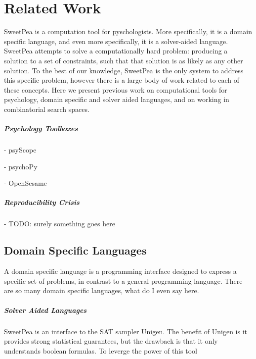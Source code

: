 

\chapter{Related Work}

SweetPea is a computation tool for pyschologists. More specifically, it is a domain specific language, and even more specifically, it is a solver-aided language. SweetPea attempts to solve a computationally hard problem: producing a solution to a set of constraints, such that that solution is as likely as any other solution. To the best of our knowledge, SweetPea is the only system to address this specific problem, however there is a large body of work related to each of these concepts. Here we present previous work on computational tools for psychology, domain specific and solver aided languages, and on working in combinatorial search spaces.

\paragraph*{Psychology Toolboxes}

- psyScope \cite{cohen1993psyscope}

- psychoPy \cite{mathot2012opensesame}

- OpenSesame \cite{peirce2009generating}

\paragraph*{Reproducibility Crisis}

- TODO: surely something goes here

\section{Domain Specific Languages}

A domain specific language is a programming interface designed to express a specific set of problems, in contrast to a general programming language. There are so many domain specific languages, what do I even say here.

\paragraph*{Solver Aided Languages}

SweetPea is an interface to the SAT sampler Unigen. The benefit of Unigen is it provides strong statistical guarantees, but the drawback is that it only understands boolean formulas. To leverge the power of this tool

